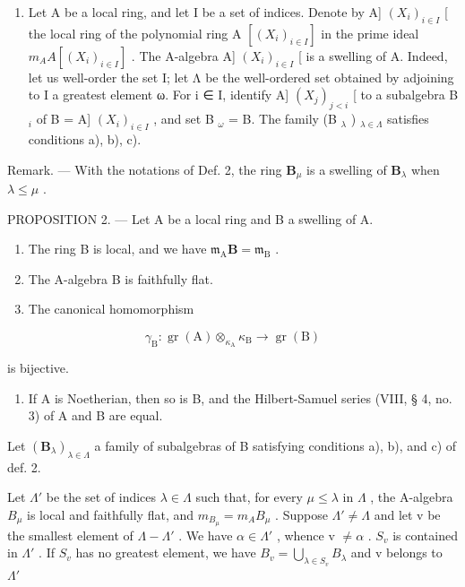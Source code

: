 \begin{enumerate}
\def\labelenumi{\arabic{enumi})}
\setcounter{enumi}{1}
\tightlist
\item
  Let A be a local ring, and let I be a set of indices. Denote by A{]} \((X_{i})_{i\in I}\) {[} the local ring of the polynomial ring A \([(X_{i})_{i\in I}]\) in the prime ideal \(m_{A}A[(X_{i})_{i\in I}]\) . The A-algebra A{]} \((X_{i})_{i\in I}\) {[} is a swelling of A. Indeed, let us well-order the set I; let Λ be the well-ordered set obtained by adjoining to I a greatest element ω. For i ∈ I, identify A{]} \((X_{j})_{j<i}\) {[} to a subalgebra B \(_{i}\) of B = A{]} \((X_{i})_{i\in I}\) , and set B \(_{\omega}\) = B. The family (B \(_{\lambda}\) ) \(_{\lambda\in\Lambda}\) satisfies conditions a), b), c).
\end{enumerate}

Remark. --- With the notations of Def. 2, the ring \(\mathbf{B}_{\mu}\) is a swelling of \(\mathbf{B}_{\lambda}\) when \(\lambda \leqslant \mu\) .

PROPOSITION 2. --- Let A be a local ring and B a swelling of A.

\begin{enumerate}
\def\labelenumi{\alph{enumi})}
\item
  The ring B is local, and we have \(\mathfrak{m}_{\mathrm{A}}\mathbf{B} = \mathfrak{m}_{\mathrm{B}}\) .
\item
  The A-algebra B is faithfully flat.
\item
  The canonical homomorphism
\end{enumerate}

\[
\gamma_ {\mathrm{B}}: \operatorname{gr} (\mathrm{A}) \otimes_ {\kappa_ {\mathrm{A}}} \kappa_ {\mathrm{B}} \rightarrow \operatorname{gr} (\mathrm{B})
\]

is bijective.

\begin{enumerate}
\def\labelenumi{\alph{enumi})}
\setcounter{enumi}{3}
\tightlist
\item
  If A is Noetherian, then so is B, and the Hilbert-Samuel series (VIII, § 4, no. 3) of A and B are equal.
\end{enumerate}

Let \((\mathbf{B}_{\lambda})_{\lambda\in\Lambda}\) a family of subalgebras of B satisfying conditions a), b), and c) of def. 2.

Let \(\Lambda'\) be the set of indices \(\lambda \in \Lambda\) such that, for every \(\mu \leqslant \lambda\) in \(\Lambda\) , the A-algebra \(B_{\mu}\) is local and faithfully flat, and \(m_{B_{\mu}} = m_A B_{\mu}\) . Suppose \(\Lambda' \neq \Lambda\) and let v be the smallest element of \(\Lambda - \Lambda'\) . We have \(\alpha \in \Lambda'\) , whence v \(\neq \alpha\) . \(S_{v}\) is contained in \(\Lambda'\) . If \(S_{v}\) has no greatest element, we have \(B_{v} = \bigcup_{\lambda \in S_{v}} B_{\lambda}\) and v belongs to \(\Lambda'\)

